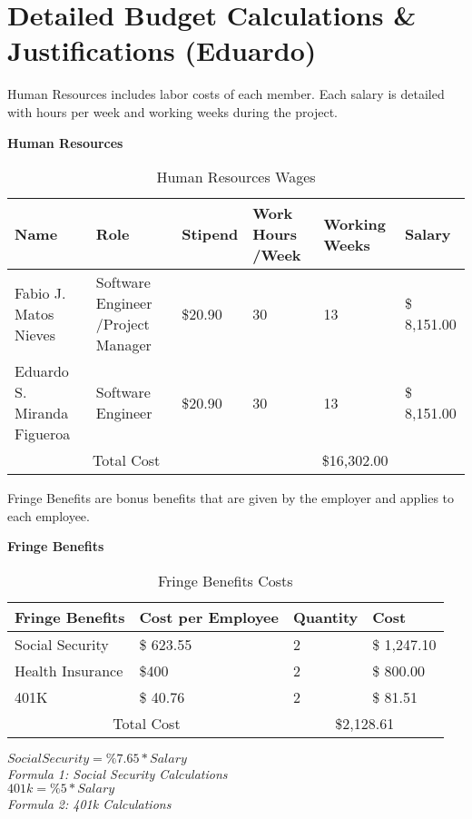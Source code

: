  \section{Detailed Budget Calculations \& Justifications (Eduardo)}
 Human Resources includes labor costs of each member.  Each salary is detailed with hours per week and working weeks during the project.\\
 \begin{table}[H]
    \centering
    \textbf{Human Resources}
    \begin{tabular}{||m{}|m{}|m{}|m{}|m{}|m{}||}
     \hline
     Name & Role & Stipend & Work Hours /Week & Working Weeks & Salary\\
     \hline
     Fabio J. Matos Nieves & Software Engineer /Project Manager& \$20.90 & 30 & 13 & \$ 8,151.00\\ 
     \hline
     Eduardo S. Miranda Figueroa & Software Engineer & \$20.90 & 30 & 13 & \$ 8,151.00\\
    
     \hline
     \multicolumn{3}{||c|}{Total Cost} & \multicolumn{3}{c||}{\$16,302.00}\\
     \hline
    \end{tabular}
    \caption {Human Resources Wages}
    \label{table:2}
\end{table}
Fringe Benefits are bonus benefits that are given by the employer and applies to each employee.\\
\begin{table}[H]
    \centering
    \textbf{Fringe Benefits\cite{WhatAreFringe}}
    \begin{tabular}{||m{}|m{}|m{}|m{}||}
        \hline 
        Fringe Benefits & Cost per Employee & Quantity & Cost\\
        \hline
        Social Security &  \$ 623.55 & 2 & \$ 1,247.10\\ 
        \hline
        Health Insurance & \$400 & 2 & \$ 800.00 \\
        \hline
        401K & \$ 40.76 & 2 & \$ 81.51\\ 
        \hline
        \multicolumn{2}{||c|}{Total Cost} & \multicolumn{2}{c||}{\$2,128.61}\\
        \hline
       \end{tabular}
       \caption {Fringe Benefits Costs}
       \label{table:3}
       $Social Security = \%7.65 * Salary$\\
      \textit{Formula 1: Social Security Calculations}\\
        $401k = \%5 * Salary$\\
        \textit{Formula 2: 401k Calculations}
       
\end{table}
